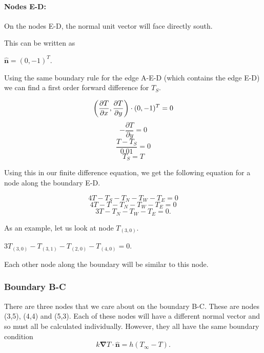 \documentclass[12pt,a4paper]{article}
\begin{document}
\paragraph*{Nodes E-D:} On the nodes E-D, the normal unit vector will face directly south. 
\begin{center}
\end{center}
This can be written as 
\begin{center}
  $\hat{\textbf{n}}=(0,-1)^T$.
\end{center}
Using the same boundary rule for the edge A-E-D (which contains the edge E-D) we can find a first order forward difference for $T_S$.
\begin{center}
\[\bigg{(}\frac{\partial T}{\partial x},\frac{\partial T}{\partial y}\bigg{)}\cdot (0,-1)^T = 0\]
\[-\frac{\partial T}{\partial y}=0\]
\[\frac{T-T_S}{0.01}=0\]
\[T_S=T\]
\end{center} 
Using this in our finite difference equation, we get the following equation for a node along the boundary E-D.
\begin{center}
  \[4T-T_S-T_N-T_W-T_E=0\]
  \[4T-T-T_N-T_W-T_E=0\]
  \[3T-T_N-T_W-T_E=0.\]
\end{center}
As an example, let us look at node $T_{(3,0)}$.
\begin{center}
  $3T_{(3,0)}-T_{(3,1)}-T_{(2,0)}-T_{(4,0)}=0$.
\end{center}
Each other node along the boundary will be similar to this node.
\subsubsection*{Boundary B-C}
There are three nodes that we care about on the boundary B-C. These are nodes (3,5), (4,4) and (5,3). Each of these nodes will have a different normal vector and so must all be calculated individually. However, they all have the same boundary condition 
\[k\boldsymbol{\nabla}T\cdot\hat{\textbf{n}} = h(T_{\infty} - T).\]
\end{document}
